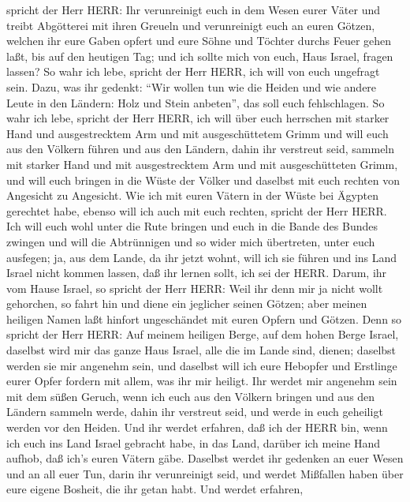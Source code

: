 spricht der Herr HERR: Ihr verunreinigt euch in dem Wesen eurer Väter
und treibt Abgötterei mit ihren Greueln  und verunreinigt
euch an euren Götzen, welchen ihr eure Gaben opfert und eure Söhne und
Töchter durchs Feuer gehen laßt, bis auf den heutigen Tag; und ich
sollte mich von euch, Haus Israel, fragen lassen? So wahr ich lebe,
spricht der Herr HERR, ich will von euch ungefragt sein. 
Dazu, was ihr gedenkt: ``Wir wollen tun wie die Heiden und wie andere
Leute in den Ländern: Holz und Stein anbeten'', das soll euch
fehlschlagen.  So wahr ich lebe, spricht der Herr HERR, ich
will über euch herrschen mit starker Hand und ausgestrecktem Arm und mit
ausgeschüttetem Grimm  und will euch aus den Völkern führen
und aus den Ländern, dahin ihr verstreut seid, sammeln mit starker Hand
und mit ausgestrecktem Arm und mit ausgeschütteten Grimm, 
und will euch bringen in die Wüste der Völker und daselbst mit euch
rechten von Angesicht zu Angesicht.  Wie ich mit euren
Vätern in der Wüste bei Ägypten gerechtet habe, ebenso will ich auch mit
euch rechten, spricht der Herr HERR.  Ich will euch wohl
unter die Rute bringen und euch in die Bande des Bundes zwingen
 und will die Abtrünnigen und so wider mich übertreten,
unter euch ausfegen; ja, aus dem Lande, da ihr jetzt wohnt, will ich sie
führen und ins Land Israel nicht kommen lassen, daß ihr lernen sollt,
ich sei der HERR.  Darum, ihr vom Hause Israel, so spricht
der Herr HERR: Weil ihr denn mir ja nicht wollt gehorchen, so fahrt hin
und diene ein jeglicher seinen Götzen; aber meinen heiligen Namen laßt
hinfort ungeschändet mit euren Opfern und Götzen.  Denn so
spricht der Herr HERR: Auf meinem heiligen Berge, auf dem hohen Berge
Israel, daselbst wird mir das ganze Haus Israel, alle die im Lande sind,
dienen; daselbst werden sie mir angenehm sein, und daselbst will ich
eure Hebopfer und Erstlinge eurer Opfer fordern mit allem, was ihr mir
heiligt.  Ihr werdet mir angenehm sein mit dem süßen
Geruch, wenn ich euch aus den Völkern bringen und aus den Ländern
sammeln werde, dahin ihr verstreut seid, und werde in euch geheiligt
werden vor den Heiden.  Und ihr werdet erfahren, daß ich
der HERR bin, wenn ich euch ins Land Israel gebracht habe, in das Land,
darüber ich meine Hand aufhob, daß ich's euren Vätern gäbe.
 Daselbst werdet ihr gedenken an euer Wesen und an all euer
Tun, darin ihr verunreinigt seid, und werdet Mißfallen haben über eure
eigene Bosheit, die ihr getan habt.  Und werdet erfahren,
